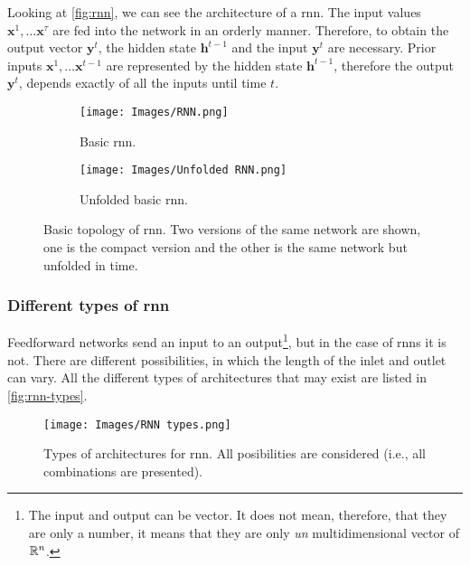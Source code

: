 Looking at \vref{fig:rnn}, we can see the architecture of a \gls{rnn}. The
input values \(\mathbf{x}^1, \ldots \mathbf{x}^\tau\) are fed into the network
in an orderly manner. Therefore, to obtain the output vector \(\mathbf{y}^t\),
the hidden state \(\mathbf{h}^{t - 1}\) and the input \(\mathbf{y}^{t}\) are
necessary. Prior inputs \(\mathbf{x}^1, \ldots \mathbf{x}^{t - 1}\) are
represented by the hidden state \(\mathbf{h}^{t - 1}\), therefore the output
\(\mathbf{y}^t\), depends exactly of all the inputs until time \(t\).

\begin{figure}[ht]
  \begin{subfigure}[t]{.2\textwidth}
    \centering
    \caption{Basic \gls{rnn}.}
    \texttt{[image: Images/RNN.png]}
  \end{subfigure}\hfill
  \begin{subfigure}[t]{.8\textwidth}
    \centering
    \caption{Unfolded basic \gls{rnn}.}
    \texttt{[image: Images/Unfolded RNN.png]}
  \end{subfigure}
  \caption[Basic topology of \acl*{rnn}]{Basic topology of \acf{rnn}. Two
    versions of the same network are shown, one is the compact version and the
    other is the same network but unfolded in time.}
  \label{fig:rnn}
\end{figure}

\subsubsection{Different types of \gls*{rnn}}

Feedforward networks send an input to an output\footnote{The input and output
  can be vector. It does not mean, therefore, that they are only a number, it
  means that they are only \emph{un} multidimensional vector of \(\mathbb{R}^n\).}, but
in the case of \glspl{rnn} it is not. There are different possibilities, in
which the length of the inlet and outlet can vary. All the different types of
architectures that may exist are listed in \vref{fig:rnn-types}.

\begin{figure}[ht]
  \centering
  \texttt{[image: Images/RNN types.png]}
  \caption[Types of architectures for \acl*{rnn}]{Types of architectures for
    \gls{rnn}. All posibilities are considered (i.e., all combinations are
    presented).}
  \label{fig:rnn-types}
\end{figure}

